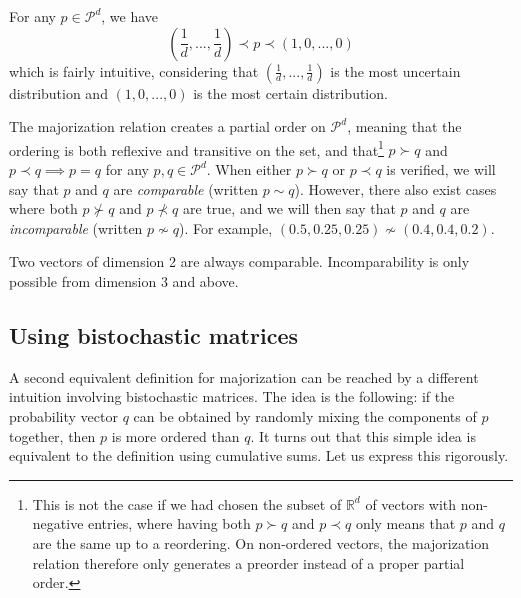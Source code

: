 \begin{remark}
    For any $p \in \mathcal{P}^d$, we have
    \begin{equation} \label{eq:top_bottom}
        \left(\frac{1}{d}, ..., \frac{1}{d}\right) \prec p \prec (1, 0, ..., 0)
    \end{equation}
    which is fairly intuitive, considering that $(\frac{1}{d}, ..., \frac{1}{d})$ is the most uncertain distribution and $(1, 0, ..., 0)$ is the most certain distribution. %
\end{remark}

The majorization relation creates a partial order on $\mathcal{P}^d$, meaning that the ordering is both reflexive and transitive on the set, and that\footnote{This is not the case if we had chosen the subset of $\mathbb{R}^d$  of vectors with non-negative entries, where having both $p \succ q$ and $p \prec q$ only means that $p$ and $q$ are the same up to a reordering. On non-ordered vectors, the majorization relation therefore only generates a preorder instead of a proper partial order.} $p \succ q$ and $p \prec q \implies p = q$ for any $p, q \in \mathcal{P}^d$. When either $p \succ q$ or $p \prec q$ is verified, we will say that $p$ and $q$ are \textit{comparable} (written $p \sim q$). However, there also exist cases where both $p \nsucc q$ and $p \nprec q$ are true, and we will then say that $p$ and $q$ are \textit{incomparable} (written $p \nsim q$). For example, $(0.5, 0.25, 0.25) \nsim (0.4, 0.4, 0.2)$.

\begin{remark}
    Two vectors of dimension 2 are always comparable. Incomparability is only possible from dimension 3 and above.
\end{remark}



\subsection{Using bistochastic matrices}

A second equivalent definition for majorization can be reached by a different intuition involving bistochastic matrices. The idea is the following: if the probability vector $q$ can be obtained by randomly mixing the components of $p$ together, then $p$ is more ordered than $q$. It turns out that this simple idea is equivalent to the definition using cumulative sums. Let us express this rigorously.


